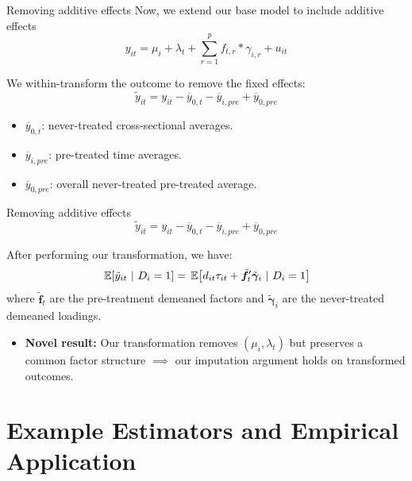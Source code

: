 \documentclass[aspectratio=43,t,11pt]{beamer}
\begin{document}
\begin{frame}{Removing additive effects}\label{slide:remove_additive_fe}
  Now, we extend our base model to include additive effects
  $$
    y_{it} = \mu_i + \lambda_t + \sum_{r = 1}^{p} f_{t,r} * \gamma_{i,r} + u_{it}
  $$
  
  We within-transform the outcome to remove the fixed effects:
  $$
    \tilde{y}_{it} = y_{it} - \overline{y}_{0,t} - \overline{y}_{i,pre} + \overline{y}_{0,pre}
  $$

  \begin{itemize}
    \item $\overline{y}_{0,t}$: never-treated cross-sectional averages.
    \item $\overline{y}_{i,pre}$: pre-treated time averages.
    \item $\overline{y}_{0,pre}$: overall never-treated pre-treated average.
  \end{itemize}

  \hyperlink{slide:twfe_test}{}
\end{frame}

\begin{frame}{Removing additive effects}
  \vspace{-\bigskipamount}
  $$
    \tilde{y}_{it} = y_{it} - \overline{y}_{0,t} - \overline{y}_{i,pre} + \overline{y}_{0,pre}
  $$

  \bigskip
  After performing our transformation, we have:
  $$
    \expec{\tilde{y}_{it}}{D_i = 1} = \expec{d_{it} \tau_{it} + \tilde{\bm f}_t' \tilde{\bm \gamma}_i }{D_i = 1}
  $$
  where $\tilde{\bm f}_t$ are the pre-treatment demeaned factors and $\tilde{\bm \gamma}_i$ are the never-treated demeaned loadings.

  \begin{itemize}
    \item \textbf{Novel result:} Our transformation removes $(\mu_i, \lambda_t)$ but preserves a common factor structure $\implies$ our imputation argument holds on transformed outcomes.
  \end{itemize}
\end{frame}

\section{Example Estimators and Empirical Application}
\end{document}
